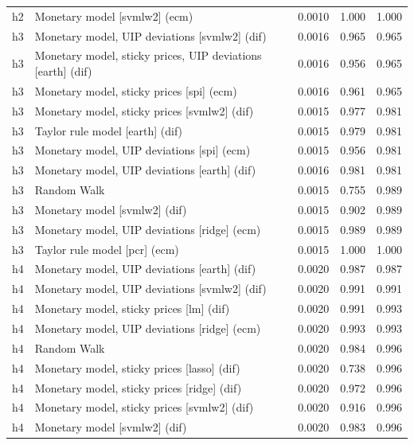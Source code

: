 \begin{ThreePartTable}
\begin{longtable}[t]{cp{5.5cm}ccc}
h2 & \raggedright Monetary model [svmlw2] (ecm) & 0.0010 & 1.000 & 1.000\\
\addlinespace
h3 & \raggedright Monetary model, UIP deviations [svmlw2] (dif) & 0.0016 & 0.965 & 0.965\\
h3 & \raggedright Monetary model, sticky prices, UIP deviations [earth] (dif) & 0.0016 & 0.956 & 0.965\\
h3 & \raggedright Monetary model, sticky prices [spi] (ecm) & 0.0016 & 0.961 & 0.965\\
h3 & \raggedright Monetary model, sticky prices [svmlw2] (dif) & 0.0015 & 0.977 & 0.981\\
h3 & \raggedright Taylor rule model [earth] (dif) & 0.0015 & 0.979 & 0.981\\
h3 & \raggedright Monetary model, UIP deviations [spi] (ecm) & 0.0015 & 0.956 & 0.981\\
h3 & \raggedright Monetary model, UIP deviations [earth] (dif) & 0.0016 & 0.981 & 0.981\\
h3 & \raggedright Random Walk & 0.0015 & 0.755 & 0.989\\
h3 & \raggedright Monetary model [svmlw2] (dif) & 0.0015 & 0.902 & 0.989\\
h3 & \raggedright Monetary model, UIP deviations [ridge] (ecm) & 0.0015 & 0.989 & 0.989\\
h3 & \raggedright Taylor rule model [pcr] (ecm) & 0.0015 & 1.000 & 1.000\\
\addlinespace
h4 & \raggedright Monetary model, UIP deviations [earth] (dif) & 0.0020 & 0.987 & 0.987\\
h4 & \raggedright Monetary model, UIP deviations [svmlw2] (dif) & 0.0020 & 0.991 & 0.991\\
h4 & \raggedright Monetary model, sticky prices [lm] (dif) & 0.0020 & 0.991 & 0.993\\
h4 & \raggedright Monetary model, UIP deviations [ridge] (ecm) & 0.0020 & 0.993 & 0.993\\
h4 & \raggedright Random Walk & 0.0020 & 0.984 & 0.996\\
h4 & \raggedright Monetary model, sticky prices [lasso] (dif) & 0.0020 & 0.738 & 0.996\\
h4 & \raggedright Monetary model, sticky prices [ridge] (dif) & 0.0020 & 0.972 & 0.996\\
h4 & \raggedright Monetary model, sticky prices [svmlw2] (dif) & 0.0020 & 0.916 & 0.996\\
h4 & \raggedright Monetary model [svmlw2] (dif) & 0.0020 & 0.983 & 0.996\\

\end{longtable}
\end{ThreePartTable}
